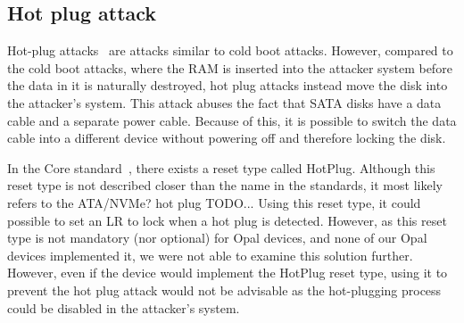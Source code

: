 \subsection{Hot plug attack}

Hot-plug attacks~\cite{Mller2013SelfEncryptingDP} are attacks similar to cold boot attacks. However, compared to the cold boot attacks, where the RAM is inserted into the attacker system before the data in it is naturally destroyed, hot plug attacks instead move the disk into the attacker's system. This attack abuses the fact that SATA disks have a data cable and a separate power cable. Because of this, it is possible to switch the data cable into a different device without powering off and therefore locking the disk.

In the Core standard~\cite{tcg-storage-core}, there exists a reset type called HotPlug. 
Although this reset type is not described closer than the name in the standards, it most likely refers to the ATA/NVMe? hot plug TODO\cite{TODO}... 
Using this reset type, it could possible to set an LR to lock when a hot plug is detected. However, as this reset type is not mandatory (nor optional) for Opal devices, and none of our Opal devices implemented it, we were not able to examine this solution further.
However, even if the device would implement the HotPlug reset type, using it to prevent the hot plug attack would not be advisable as the hot-plugging process could be disabled in the attacker's system.


